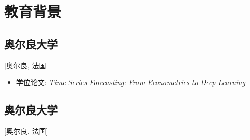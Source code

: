 \documentclass{mycv}
\begin{document}
\maketitle



\section{教育背景}

\subsection{\large 奥尔良大学}[奥尔良, 法国]

\vspace{0.3em}

\begin{positions}
\end{positions}

\begin{itemize}
  \item 学位论文: \textit{Time Series Forecasting: From Econometrics to Deep Learning}
\end{itemize}

\vspace{-\parskip}

\subsection{\large 奥尔良大学}[奥尔良, 法国]

\vspace{0.3em}
\end{document}
